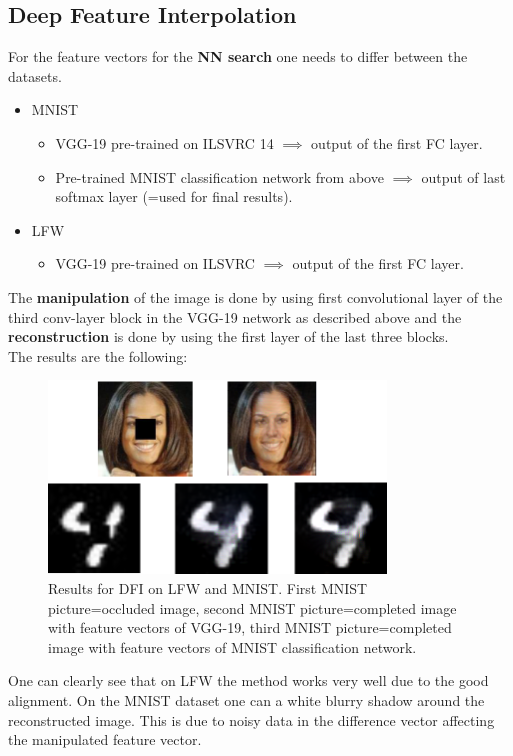 \documentclass[
     11pt,         %
     a4paper,      %
     oneside,
     ]{article}
\begin{document}
\subsection{Deep Feature Interpolation}
For the feature vectors for the \textbf{NN search} one needs to differ between the datasets.
\begin{itemize}
  \item MNIST
  \begin{itemize}
    \item VGG-19 pre-trained on ILSVRC 14 $\implies$ output of the first FC layer.
    \item Pre-trained MNIST classification network from above $\implies$ output of last softmax layer (=used for final results).
  \end{itemize}
  \item LFW
  \begin{itemize}
    \item VGG-19 pre-trained on ILSVRC $\implies$ output of the first FC layer.
  \end{itemize}
\end{itemize}
The \textbf{manipulation} of the image is done by using first convolutional layer of the third conv-layer block in the VGG-19 network as described above and the \textbf{reconstruction} is done by using the first layer of the last three blocks.\\
The results are the following:
  \begin{figure}[H]
    \begin{center}
      \includegraphics[width=0.8\textwidth]{images/DFI-final2.png}
      \caption{Results for DFI on LFW and MNIST. First MNIST picture=occluded image, second MNIST picture=completed image with feature vectors of VGG-19, third MNIST picture=completed image with feature vectors of MNIST classification network.}
    \end{center}
  \end{figure}
One can clearly see that on LFW the method works very well due to the good alignment. On the MNIST dataset one can a white blurry shadow around the reconstructed image. This is due to noisy data in the difference vector affecting the manipulated feature vector.
\end{document}
